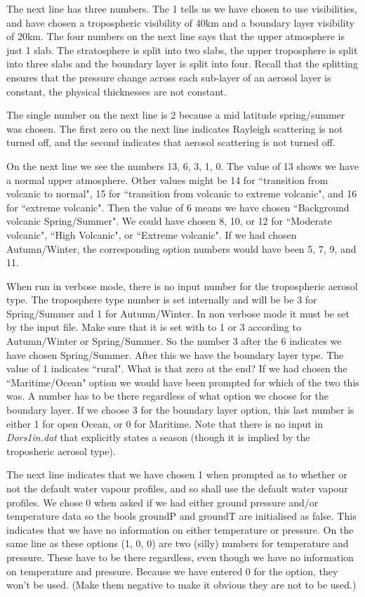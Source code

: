 \documentclass[12pt]{article}
\begin{document}
 The next line has three numbers. The 1 tells us we have chosen to
 use visibilities,  and have chosen a tropospheric visibility of 40km and a boundary layer visibility
of 20km. The four numbers on the next line says that the 
upper atmosphere is just 1 slab. The stratosphere is split into two slabs, the upper
troposphere is split into three slabs and the boundary layer is split into four. Recall 
that the splitting ensures that the pressure change across each sub-layer of an
aerosol layer is constant, the physical thicknesses are not constant.

The single number on the next line is 2 because a mid latitude spring/summer was chosen.
The first zero on the next line indicates Rayleigh scattering is not turned off, and
the second indicates that aerosol scattering is not turned off.

On the next line we see the numbers 13, 6, 3, 1, 0.
The value of 13 shows we have a normal upper atmosphere. Other values might be 14 for ``transition
from volcanic to normal", 15 for ``transition from volcanic to extreme volcanic", and 16 for
 ``extreme volcanic". Then the value of 6 means we have chosen ``Background volcanic Spring/Summer".
We could have chosen 8, 10, or 12 for ``Moderate volcanic", ``High Volcanic", or ``Extreme volcanic".
If we had chosen Autumn/Winter, the corresponding option numbers would have been 5, 7, 9, and 11.

When run in verbose mode, there is no input number for the tropospheric aerosol type. 
The troposphere type number is set
internally and will be 
be 3 for Spring/Summer and 1 for Autumn/Winter. In non verbose mode it must be set by the input file.
Make sure that it is set with to 1 or 3 according to Autumn/Winter or Spring/Summer. 
So the number 3 after the 6 indicates we have chosen Spring/Summer. After this we have the boundary layer type.
The value of 1 indicates ``rural".
What is that zero at the end? If we had chosen the ``Maritime/Ocean" option we would have
been prompted for which of the two this was. A number has to be there regardless of what option
we choose for the boundary layer. If we choose 3 for the boundary layer option, this last number is
either 1 for open Ocean, or 0 for Maritime.
Note that there is no input in {\it Dors1in.dat} that explicitly states a season (though it is implied
by the troposheric aerosol type). 

The next line indicates that we have chosen 1 when prompted as to whether or not
the default water vapour profiles, and so shall use the default water vapour profiles. We chose 0 
when asked if we had either ground pressure and/or temperature data 
so the bools groundP and groundT are initialised as false.
 This indicates that  we have no information  on either temperature or pressure. 
On the same line as these options (1, 0, 0) 
are two (silly) numbers for
temperature and pressure. These have to be there regardless, even though we have no information
on temperature and pressure. Because we have entered 0 for the option, they won't be used.  
(Make them negative to make it obvious they are not to be used.)
\end{document}
